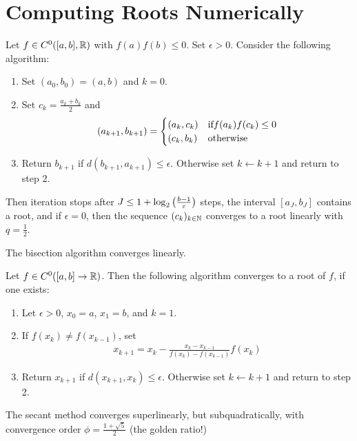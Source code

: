 \section{Computing Roots Numerically}
\begin{theorem}
	Let $f \in C^0([a,b], \mathbb{R})$ with $f(a)f(b) \leq 0$. Set $\epsilon > 0$. Consider the following algorithm:
	\begin{enumerate}
		\item Set $(a_0, b_0) = (a,b)$ and $k = 0$.
		\item Set $c_k = \frac{a_k + b_k}{2}$ and
		\begin{align*}
			(a_{k+1}, b_{k+1}) = \begin{cases}
				(a_k, c_k) & \textnormal{if} f(a_k)f(c_k) \leq 0\\
				(c_k, b_k) & \textnormal{otherwise}
			\end{cases}
		\end{align*}
		\item Return $b_{k+1}$ if $d(b_{k+1}, a_{k+1}) \leq \epsilon$. Otherwise set $k \gets k+1$ and return to step 2.
	\end{enumerate}	
	Then iteration stops after $J \leq 1 + \log_2\qty(\frac{b-1}{\varepsilon})$ steps, the interval $[a_J, b_J]$ contains a root, and if $\epsilon = 0$, then the sequence $(c_k)_{k \in \mathbb{N}}$ converges to a root linearly with $q = \frac{1}{2}$. 
\end{theorem}
\begin{proposition}
	The bisection algorithm converges linearly.
\end{proposition}
\begin{theorem}
	 Let $f \in C^0([a,b] \to \mathbb{R})$. Then the following algorithm converges to a root of $f$, if one exists:
	\begin{enumerate}
		\item Let $\epsilon > 0$, $x_0 = a$, $x_1 = b$, and $k = 1$.
		\item If $f(x_k) \neq f(x_{k-1})$, set
		\begin{align*}
			x_{k+1} = x_k - \frac{x_k - x_{k-1}}{f(x_k) - f(x_{k-1})}f(x_k)
		\end{align*}
		\item Return $x_{k+1}$ if $d(x_{k+1}, x_k) \leq \epsilon$. Otherwise set $k \gets k+1$ and return to step 2.
	\end{enumerate}
\end{theorem}
\begin{proposition}
	The secant method converges superlinearly, but subquadratically, with convergence order $\phi = \frac{1 + \sqrt{5}}{2}$ (the golden ratio!)
\end{proposition}
